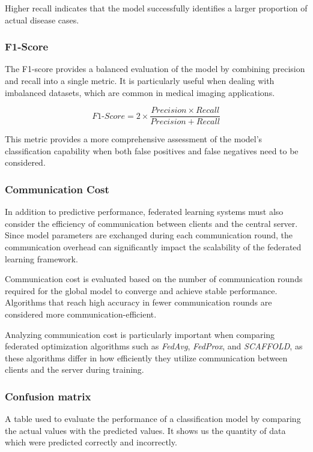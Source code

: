 \documentclass[12pt]{book}
\begin{document}
Higher recall indicates that the model successfully identifies a larger proportion of actual disease cases.

\subsubsection{F1-Score}

The F1-score provides a balanced evaluation of the model by combining precision and recall into a single metric. It is particularly useful when dealing with imbalanced datasets, which are common in medical imaging applications.

\begin{equation}
F1\text{-}Score = 2 \times \frac{Precision \times Recall}{Precision + Recall}
\end{equation}

This metric provides a more comprehensive assessment of the model's classification capability when both false positives and false negatives need to be considered.

\subsubsection{Communication Cost}

In addition to predictive performance, federated learning systems must also consider the efficiency of communication between clients and the central server. Since model parameters are exchanged during each communication round, the communication overhead can significantly impact the scalability of the federated learning framework.

Communication cost is evaluated based on the number of communication rounds required for the global model to converge and achieve stable performance. Algorithms that reach high accuracy in fewer communication rounds are considered more communication-efficient.

Analyzing communication cost is particularly important when comparing federated optimization algorithms such as \textit{FedAvg}, \textit{FedProx}, and \textit{SCAFFOLD}, as these algorithms differ in how efficiently they utilize communication between clients and the server during training.\\

\subsubsection{Confusion matrix}
A table used to evaluate the performance of a classification model by comparing the actual values with the predicted values. It shows us the quantity of data which were predicted correctly and incorrectly.\\
\end{document}
